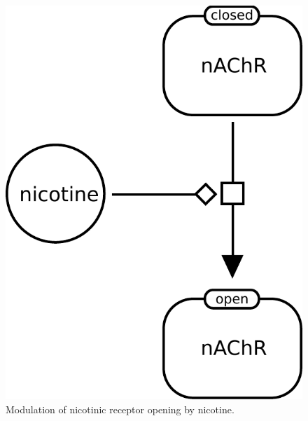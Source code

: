 \begin{figure}[H]
  \centering
  \includegraphics[scale = 0.5]{examples/modulation-nAChR}
  \caption{Modulation of nicotinic receptor opening by nicotine.}
  \label{fig:modul-nico}
\end{figure}


